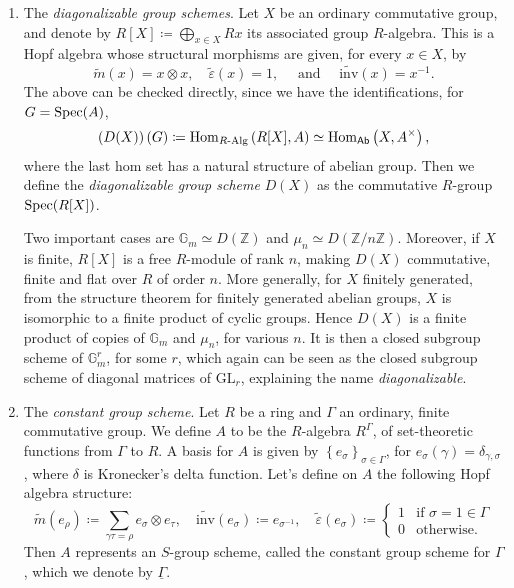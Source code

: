 \begin{ex}
\begin{enumerate}
		\item The \emph{diagonalizable group schemes}. Let $X$ be an ordinary
			commutative group, and denote by $R[X] \coloneqq \bigoplus_{x \in X} Rx$
			its associated group $R$-algebra.
			This is a Hopf algebra whose structural morphisms
			are given, for every $x \in X$, by
			\begin{equation*}
				\widetilde{m}(x) = x \otimes x,
				\quad
				\widetilde{\varepsilon}(x) = 1,
				\quad \text{ and } \quad
				\widetilde{\mathrm{inv}}(x) = x^{-1}
			.\end{equation*} 
			The above can be checked directly, since we have
			the identifications, for $G = \operatorname{Spec}(A)$,
			\begin{equation*}
				\left( D(X) \right)(G) \coloneqq
				\operatorname{Hom}_{R \text{-Alg}} \left( R[X], A \right) \simeq
				\operatorname{Hom}_{\mathsf{Ab}} \left( X, A^{\times} \right)
			,\end{equation*} 
			where the last hom set has a natural structure of abelian
			group.
			Then we define the \emph{diagonalizable group scheme} $D(X)$
			as the commutative $R$-group $\operatorname{Spec}(R[X])$.

			Two important cases are $\mathbb{G}_m \simeq D(\mathbb{Z})$
			and $\mu_n \simeq D(\mathbb{Z}/n\mathbb{Z})$.
			Moreover, if $X$ is finite, $R[X]$ is a free $R$-module of rank $n$,
			making $D(X)$ commutative, finite and flat over $R$
			of order \(n\).
			More generally, for $X$ finitely generated, 
			from the structure theorem for finitely generated abelian groups, 
			$X$ is isomorphic to a finite product of cyclic groups.
			Hence $D(X)$ is a finite product of copies of $\mathbb{G}_m$
			and $\mu_n$, for various $n$.
			It is then a closed subgroup scheme of $\mathbb{G}_m^r$, for some $r$,
			which again can be seen as the closed subgroup scheme of diagonal
			matrices of $\mathrm{GL}_r$, explaining the name 
			\emph{diagonalizable}.


		\item The \emph{constant group scheme}\label{ex:ConstantGroups}.
			Let $R$ be a ring and $\Gamma$ an ordinary, finite commutative group.
			We define $A$ to be the $R$-algebra $R^\Gamma$,
			of set-theoretic functions from $\Gamma$ to $R$.
			A basis for $A$ is given by $\left\{ e_\sigma \right\}_{\sigma \in \Gamma}$,
			for $e_\sigma(\gamma) = \delta_{\gamma,\sigma}$,
			where $\delta$ is Kronecker's delta function.
			Let's define on \(A\) the following Hopf algebra structure:
			\begin{equation*}
				\widetilde{m}(e_\rho) \coloneqq
				\sum_{\gamma\tau = \rho}^{} e_\sigma \otimes e_\tau, 
				\quad
				\widetilde{\mathrm{inv}}(e_\sigma) \coloneqq e_{\sigma^{-1}}, 
				\quad
				\widetilde{\varepsilon}(e_\sigma) \coloneqq
				\begin{cases}
					1 & \text{if } \sigma = 1 \in \Gamma\\
					0 & \text{otherwise}.
				\end{cases}
			\end{equation*}
			Then $A$ represents an $S$-group scheme,
			called the constant group scheme for $\Gamma$,
			which we denote by $\underline{\Gamma}$.



\end{enumerate}
\end{ex}
